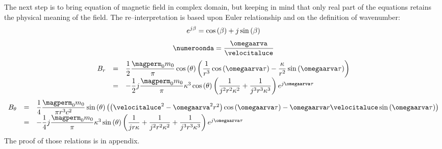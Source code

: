 The next step is to bring equation of magnetic field in complex domain, but keeping in mind that only real part of the equations retains the physical meaning of the field. The re--interpretation is based upon Euler relationship and on the definition of wavenumber:
\[
e^{j\beta} = \cos\left( \beta \right) + j \sin\left( \beta \right)
\]
\[
\numeroonda = \dfrac{\omegaarva}{\velocitaluce}
\]
\begin{equation}
\begin{array}{rcl}
B_r & = & \dfrac{1}{2} \dfrac{\magperm_0 m_0}{\pi} \ccos{\theta} \braces{\dfrac{1}{r^3}\ccos{\omegaarva \tau} - \dfrac{\kappa}{r^2} \ssin{\omegaarva \tau}} \\
 & = & -\dfrac{1}{2} j \dfrac{\magperm_0 m_0}{\pi} \kappa^3 \ccos{\theta} \braces{\dfrac{1}{j^2 r^2 \kappa^2} + \dfrac{1}{j^3 r^3 \kappa^3}} e^{j\omegaarva \tau}
\end{array}
\end{equation}
\begin{equation}
\begin{array}{rcl}
B_{\theta} & = & \dfrac{1}{4} \dfrac{\magperm_0 m_0}{\pi r^3 c^2} \ssin{\theta} \braces{\braces{\velocitaluce^2 - \omegaarva^2 r^2}\ccos{\omegaarva \tau} - \omegaarva r \velocitaluce \ssin{\omegaarva \tau}} \\
 & = & -\dfrac{1}{4} j \dfrac{\magperm_0 m_0}{\pi} \kappa^3 \ssin{\theta} \braces{\dfrac{1}{j r \kappa} + \dfrac{1}{j^2 r^2 \kappa^2} + \dfrac{1}{j^3 r^3 \kappa^3}} e^{j\omegaarva \tau}
\end{array}
\end{equation}
The proof of those relations is in appendix.

